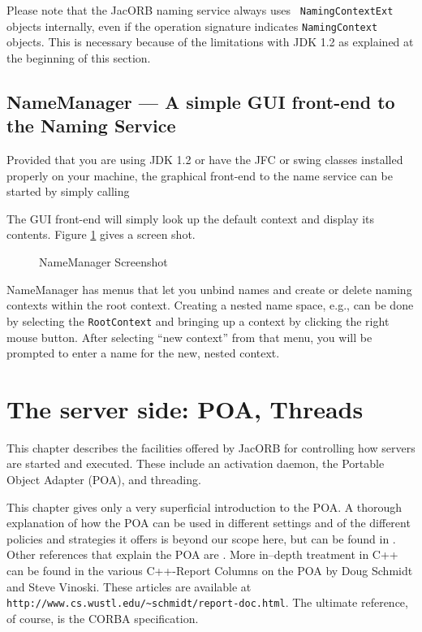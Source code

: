 \documentclass[12pt]{scrbook}
\begin{document}
Please  note   that  the  JacORB  naming  service   always  uses  {\tt
NamingContextExt} objects internally,  even if the operation signature
indicates {\tt  NamingContext} objects.  This is  necessary because of
the limitations  with JDK  1.2 as explained  at the beginning  of this
section.

\section{NameManager --- A simple GUI front-end to the Naming Service}

Provided that you  are using JDK 1.2 or have the  JFC or swing classes
installed  properly on your  machine, the  graphical front-end  to the
name service can be started by simply calling


The GUI front-end will simply look up the default context and display
its contents. Figure \ref{fig:nameManager} gives a screen shot.

\bigskip
\begin{figure}[htb]
\centerline{}
\caption{NameManager Screenshot}
\label{fig:nameManager}
\end{figure}

NameManager has menus  that let you unbind names  and create or delete
naming contexts within the root context. Creating a nested name space,
e.g., can be done by selecting the {\tt RootContext} and bringing up a
context  by clicking  the right  mouse button.  After  selecting ``new
context'' from that menu, you will be  prompted to enter a name for the
new, nested context.



\chapter{The server side: POA, Threads}
\label{POA}

This  chapter   describes  the   facilities  offered  by   JacORB  for
controlling  how servers are  started and  executed. These  include an
activation daemon, the Portable Object Adapter (POA), and threading.

This chapter gives only a very superficial introduction to the POA.  A
thorough explanation of how the  POA can be used in different settings
and of the  different policies and strategies it  offers is beyond our
scope here,  but can be found in  \cite{Brose2001a}.  Other references
that  explain  the  POA  are  \cite{Henning1999,  Vinoski1998}.   More
in--depth  treatment in  C++ can  be found  in the  various C++-Report
Columns on the POA by  Doug Schmidt and Steve Vinoski.  These articles
are                            available                            at
\verb+http://www.cs.wustl.edu/~schmidt/report-doc.html+.  The ultimate
reference, of course, is the CORBA specification.
\end{document}
